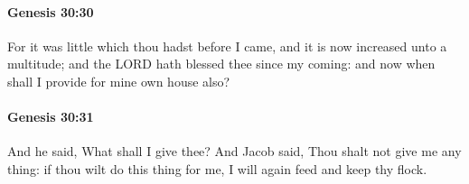 		\paragraph{Genesis 30:30} %
			\label{GENESIS-30-30}

			For it was little which thou hadst before I came, and it is now increased unto a multitude; and the LORD hath blessed thee since my coming: and now when shall I provide for mine own house also?


		\paragraph{Genesis 30:31} %
			\label{GENESIS-30-31}

			And he said, What shall I give thee? And Jacob said, Thou shalt not give me any thing: if thou wilt do this thing for me, I will again feed and keep thy flock.


